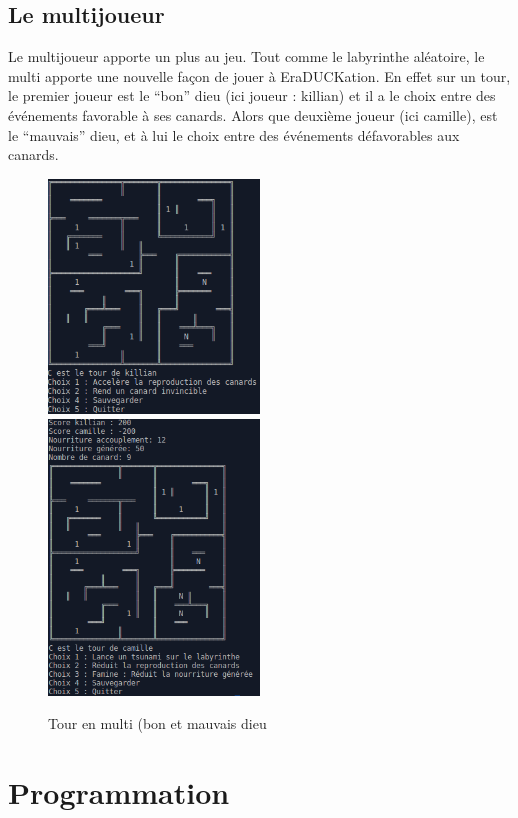 \documentclass[12pt,a4paper,twoside]{article}
\begin{document}
\subsection{Le multijoueur}
Le multijoueur apporte un plus au jeu. Tout comme le labyrinthe aléatoire, le multi
apporte une nouvelle façon de jouer à EraDUCKation. En effet sur un tour, le premier joueur est le “bon” dieu (ici joueur : killian) et il a le choix entre des événements favorable à ses canards. Alors que deuxième joueur (ici camille), est le “mauvais” dieu, et à lui le choix entre des événements défavorables aux canards.
\begin{figure}[h]
\includegraphics[width=0.5\textwidth]{tour_kiki.png}
\includegraphics[width=0.5\textwidth]{tour_cam.png}
\caption{Tour en multi (bon et mauvais dieu}
\end{figure}
\newpage
\section{Programmation}
\end{document}
